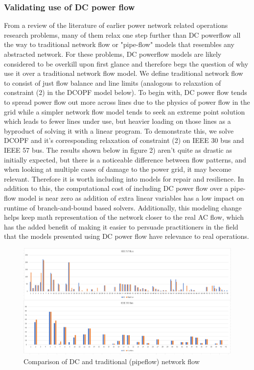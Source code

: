 \documentclass{article}
\begin{document}
	\subsubsection{Validating use of DC power flow}
	
	From a review of the literature of earlier power network related operations research problems, many of them relax one step further than DC powerflow all the way to traditional network flow or "pipe-flow" models that resembles any abstracted network. For these problems, DC powerflow models are likely considered to be overkill upon first glance and therefore begs the question of why use it over a traditional network flow model. We define traditional network flow to consist of just flow balance and line limits (analogous to relaxation of constraint (2) in the DCOPF model below). To begin with, DC power flow tends to spread power flow out more across lines due to the physics of power flow in the grid while a simpler network flow model tends to seek an extreme point solution which leads to fewer lines under use, but heavier loading on those lines as a byproduct of solving it with a linear program. To demonstrate this, we solve DCOPF and it's corresponding relaxation of constraint (2) on IEEE 30 bus and IEEE 57 bus. The results shown below in figure 2) aren't quite as drastic as initially expected, but there is a noticeable difference between flow patterns, and when looking at multiple cases of damage to the power grid, it may become relevant. Therefore it is worth including into models for repair and resilience. In addition to this, the computational cost of including DC power flow over a pipe-flow model is near zero as addition of extra linear variables has a low impact on runtime of branch-and-bound based solvers. Additionally, this modeling change helps keep math representation of the network closer to the real AC flow, which has the added benefit of making it easier to persuade practitioners in the field that the models presented using DC power flow have relevance to real operations.
	
	\begin{figure}
		\centering
		\includegraphics[width=\linewidth]{DCvsPipeflow.PNG}
		\caption{Comparison of DC and traditional (pipeflow) network flow}
	\end{figure}
	
\end{document}
